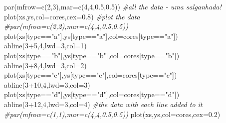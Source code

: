 \documentclass[
]{book}
\newenvironment{Shaded}{\begin{snugshade}}{\end{snugshade}}
\newcommand{\AttributeTok}[1]{\textcolor[rgb]{0.77,0.63,0.00}{#1}}
\newcommand{\CommentTok}[1]{\textcolor[rgb]{0.56,0.35,0.01}{\textit{#1}}}
\newcommand{\DecValTok}[1]{\textcolor[rgb]{0.00,0.00,0.81}{#1}}
\newcommand{\FloatTok}[1]{\textcolor[rgb]{0.00,0.00,0.81}{#1}}
\newcommand{\FunctionTok}[1]{\textcolor[rgb]{0.00,0.00,0.00}{#1}}
\newcommand{\NormalTok}[1]{#1}
\newcommand{\SpecialCharTok}[1]{\textcolor[rgb]{0.00,0.00,0.00}{#1}}
\newcommand{\StringTok}[1]{\textcolor[rgb]{0.31,0.60,0.02}{#1}}
\begin{document}
\begin{Shaded}
\begin{Highlighting}[]
\FunctionTok{par}\NormalTok{(}\AttributeTok{mfrow=}\FunctionTok{c}\NormalTok{(}\DecValTok{2}\NormalTok{,}\DecValTok{3}\NormalTok{),}\AttributeTok{mar=}\FunctionTok{c}\NormalTok{(}\DecValTok{4}\NormalTok{,}\DecValTok{4}\NormalTok{,}\FloatTok{0.5}\NormalTok{,}\FloatTok{0.5}\NormalTok{))}
\CommentTok{\#all the data {-} uma salganhada!}
\FunctionTok{plot}\NormalTok{(xs,ys,}\AttributeTok{col=}\NormalTok{cores,}\AttributeTok{cex=}\FloatTok{0.8}\NormalTok{)}
\CommentTok{\#plot the data}
\CommentTok{\#par(mfrow=c(2,2),mar=c(4,4,0.5,0.5))}
\FunctionTok{plot}\NormalTok{(xs[type}\SpecialCharTok{==}\StringTok{"a"}\NormalTok{],ys[type}\SpecialCharTok{==}\StringTok{"a"}\NormalTok{],}\AttributeTok{col=}\NormalTok{cores[type}\SpecialCharTok{==}\StringTok{"a"}\NormalTok{])}
\FunctionTok{abline}\NormalTok{(}\DecValTok{3}\SpecialCharTok{+}\DecValTok{5}\NormalTok{,}\DecValTok{4}\NormalTok{,}\AttributeTok{lwd=}\DecValTok{3}\NormalTok{,}\AttributeTok{col=}\DecValTok{1}\NormalTok{)}
\FunctionTok{plot}\NormalTok{(xs[type}\SpecialCharTok{==}\StringTok{"b"}\NormalTok{],ys[type}\SpecialCharTok{==}\StringTok{"b"}\NormalTok{],}\AttributeTok{col=}\NormalTok{cores[type}\SpecialCharTok{==}\StringTok{"b"}\NormalTok{])}
\FunctionTok{abline}\NormalTok{(}\DecValTok{3}\SpecialCharTok{+}\DecValTok{8}\NormalTok{,}\DecValTok{4}\NormalTok{,}\AttributeTok{lwd=}\DecValTok{3}\NormalTok{,}\AttributeTok{col=}\DecValTok{2}\NormalTok{)}
\FunctionTok{plot}\NormalTok{(xs[type}\SpecialCharTok{==}\StringTok{"c"}\NormalTok{],ys[type}\SpecialCharTok{==}\StringTok{"c"}\NormalTok{],}\AttributeTok{col=}\NormalTok{cores[type}\SpecialCharTok{==}\StringTok{"c"}\NormalTok{])}
\FunctionTok{abline}\NormalTok{(}\DecValTok{3}\SpecialCharTok{+}\DecValTok{10}\NormalTok{,}\DecValTok{4}\NormalTok{,}\AttributeTok{lwd=}\DecValTok{3}\NormalTok{,}\AttributeTok{col=}\DecValTok{3}\NormalTok{)}
\FunctionTok{plot}\NormalTok{(xs[type}\SpecialCharTok{==}\StringTok{"d"}\NormalTok{],ys[type}\SpecialCharTok{==}\StringTok{"d"}\NormalTok{],}\AttributeTok{col=}\NormalTok{cores[type}\SpecialCharTok{==}\StringTok{"d"}\NormalTok{])}
\FunctionTok{abline}\NormalTok{(}\DecValTok{3}\SpecialCharTok{+}\DecValTok{12}\NormalTok{,}\DecValTok{4}\NormalTok{,}\AttributeTok{lwd=}\DecValTok{3}\NormalTok{,}\AttributeTok{col=}\DecValTok{4}\NormalTok{)}
\CommentTok{\#the data with each line added to it}
\CommentTok{\#par(mfrow=c(1,1),mar=c(4,4,0.5,0.5))}
\FunctionTok{plot}\NormalTok{(xs,ys,}\AttributeTok{col=}\NormalTok{cores,}\AttributeTok{cex=}\FloatTok{0.2}\NormalTok{)}

\end{Highlighting}
\end{Shaded}
\end{document}
